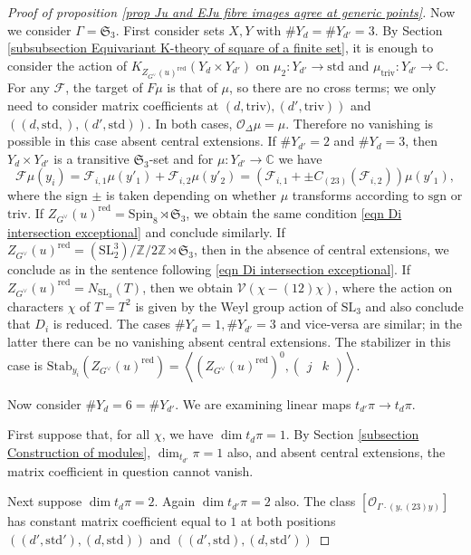 \documentclass[10pt]{article}
\newcommand{\bangles}[1]{\left\langle #1 \right\rangle}
\newcommand{\stab}[2]{\mathrm{Stab}_{#1}(#2)}
\newcommand{\Ff}{\mathcal{F}}
\newcommand{\Z}{\mathbb{Z}}
\newcommand{\C}{\mathbb{C}}
\newcommand{\Oo}{\mathcal{O}}
\newcommand{\SL}{\mathrm{SL}}
\newcommand{\Spin}{\mathrm{Spin}}
\newcommand{\Sn}{\mathfrak{S}}
\newcommand{\triv}{\mathrm{triv}}
\newcommand{\sgn}{\mathrm{sgn}}
\theoremstyle{definition}
\theoremstyle{remark}
\newcommand{\Zur}{Z_{G^\vee}(u)^{\mathrm{red}}}
\newcommand{\std}{\mathrm{std}}
\begin{document}
\begin{proof}[Proof of proposition \ref{prop Ju and EJu fibre images agree at generic points}]
Now we consider $\Gamma=\Sn_3$. First consider sets $X,Y$ with $\# Y_d=\# Y_{d'}=3$. By Section \ref{subsubsection Equivariant K-theory of square of a finite set}, it is enough to consider the action of $K_{\Zur}(Y_d\times Y_{d'})$ on $\mu_2\colon Y_{d'}\to \std$ and $\mu_\triv\colon Y_{d'}\to\C$. For any $\Ff$, the target of $F\mu$ is that of $\mu$, so there are no cross terms; we only need to consider matrix coefficients at $\left(d,\triv), (d',\triv)\right)$ and $\left((d, \std,), (d', \std)\right)$.
In both cases, $\Oo_\Delta\mu=\mu$. Therefore no vanishing is possible in this case absent central extensions. If $\#Y_{d'}=2$ and $\#Y_d=3$, then $Y_d\times Y_{d'}$ is a transitive $\Sn_3$-set and for $\mu\colon Y_{d'}\to\C$ we have 
%
\begin{equation}
\label{eqn S3 matrix coefficients}
\Ff\mu(y_i)=\Ff_{i,1}\mu(y'_1)+\Ff_{i,2}\mu(y'_2)=\left(\Ff_{i,1}+\pm C_{(23)}(\Ff_{i,2})\right)\mu(y'_1),
\end{equation}
%
where the sign $\pm$ is taken depending on whether $\mu$ transforms according to $\sgn$ or $\triv$. If $\Zur=\Spin_8\rtimes\Sn_3$, we obtain the same condition \eqref{eqn Di intersection exceptional} and conclude similarly.
If $\Zur=(\SL_2^3)/\Z/2\Z\rtimes\Sn_3$, then in the absence of central extensions, we conclude as in the sentence following \eqref{eqn Di intersection exceptional}. If $\Zur=N_{\SL_3}(T)$, then we obtain $\mathcal{V}(\chi-(12)\chi)$, where the action on characters $\chi$ of $T=T^2$ is given by the Weyl group action of $\SL_3$ and also conclude that $D_i$ is reduced.
The cases $\# Y_d=1, \#Y_{d'}=3$ and vice-versa are similar; in the latter there can be no vanishing absent central extensions. The stabilizer in this case is $\stab{y_i}{\Zur}=\bangles{(\Zur)^0, \begin{pmatrix}
j&k
\end{pmatrix}}$.


Now consider $\#Y_d=6=\# Y_{d'}$. We are examining linear maps $t_{d'}\pi\to t_d\pi$.
 
First suppose that, for all $\chi$, we have $\dim t_d\pi=1$. By Section \ref{subsection Construction of modules}, $\dim_{t_{d'}}\pi=1$ also, and absent central extensions, the matrix coefficient in question cannot vanish.

Next suppose $\dim t_{d}\pi=2$. Again $\dim t_{d'}\pi=2$ also. The class $[\Oo_{\Gamma\cdot(y,(23)y)}]$ has constant matrix coefficient equal to $1$ at both positions $\left((d', \std'), (d, \std)\right)$ and $\left((d', \std), (d, \std')\right)$ 


\end{proof}
\end{document}
